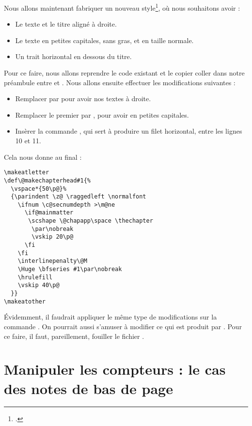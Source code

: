 Nous allons maintenant fabriquer un nouveau style\footcite[Nous nous inspirons ici du style de la classe ][]{bredele}, où
nous souhaitons avoir :
\begin{itemize}
\item Le texte  et le titre aligné à droite.
\item Le texte  en  petites capitales, sans gras, et en taille normale.
\item Un trait horizontal en dessous du titre.
\end{itemize}

Pour ce faire, nous allons reprendre le code existant et le copier coller dans notre préambule entre  et . Nous allons ensuite effectuer les modifications suivantes :

\begin{itemize}
\item Remplacer  par  pour avoir nos textes à droite.
\item Remplacer le premier  par , pour avoir  en petites capitales.
\item Insèrer la commande , qui sert à produire un filet horizontal, entre les lignes 10 et 11.
\end{itemize}

Cela nous donne au final :

\begin{verbatim}
\makeatletter
\def\@makechapterhead#1{%
  \vspace*{50\p@}%
  {\parindent \z@ \raggedleft \normalfont
    \ifnum \c@secnumdepth >\m@ne
      \if@mainmatter
       \scshape \@chapapp\space \thechapter
        \par\nobreak
        \vskip 20\p@
      \fi
    \fi
    \interlinepenalty\@M
    \Huge \bfseries #1\par\nobreak
    \hrulefill
    \vskip 40\p@
  }}
\makeatother
\end{verbatim}

Évidemment, il faudrait appliquer le même type de modifications sur la commande . On pourrait aussi s'amuser à modifier ce qui est produit par . Pour ce faire, il faut, pareillement, fouiller le fichier .

\section[Manipuler les compteurs]{Manipuler les compteurs : le cas des notes de bas de page}\label{manipcompteurs}

